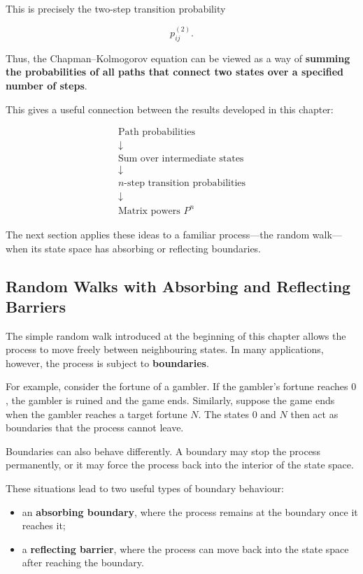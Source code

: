 \documentclass[
  letterpaper,
  DIV=11,
  numbers=noendperiod]{scrartcl}
\providecommand{\tightlist}{%
  \setlength{\itemsep}{0pt}\setlength{\parskip}{0pt}}
\theoremstyle{definition}
\theoremstyle{remark}
\begin{document}
This is precisely the two-step transition probability

\[
p_{ij}^{(2)}.
\]

Thus, the Chapman--Kolmogorov equation can be viewed as a way of
\textbf{summing the probabilities of all paths that connect two states
over a specified number of steps}.

This gives a useful connection between the results developed in this
chapter:

\[
\boxed{
\begin{array}{c}
\text{Path probabilities}\\[2mm]
\downarrow\\
\text{Sum over intermediate states}\\[2mm]
\downarrow\\
\text{$n$-step transition probabilities}\\[2mm]
\downarrow\\
\text{Matrix powers }P^n
\end{array}
}
\]

The next section applies these ideas to a familiar process---the random
walk---when its state space has absorbing or reflecting boundaries.

\subsection{Random Walks with Absorbing and Reflecting
Barriers}\label{random-walks-with-absorbing-and-reflecting-barriers}

The simple random walk introduced at the beginning of this chapter
allows the process to move freely between neighbouring states. In many
applications, however, the process is subject to \textbf{boundaries}.

For example, consider the fortune of a gambler. If the gambler's fortune
reaches \(0\), the gambler is ruined and the game ends. Similarly,
suppose the game ends when the gambler reaches a target fortune \(N\).
The states \(0\) and \(N\) then act as boundaries that the process
cannot leave.

Boundaries can also behave differently. A boundary may stop the process
permanently, or it may force the process back into the interior of the
state space.

These situations lead to two useful types of boundary behaviour:

\begin{itemize}
\tightlist
\item
  an \textbf{absorbing boundary}, where the process remains at the
  boundary once it reaches it;
\item
  a \textbf{reflecting barrier}, where the process can move back into
  the state space after reaching the boundary.
\end{itemize}
\end{document}
